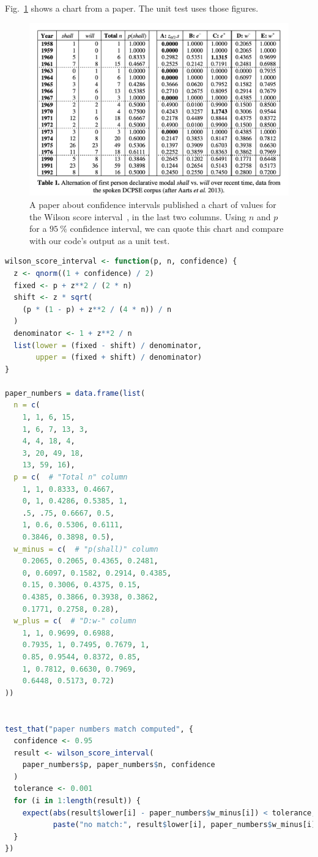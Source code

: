 \documentclass[fleqn,10pt]{olplainarticle}
\begin{document}
Fig.~\ref{fig:wilson_chart} shows a chart from a paper. The unit test
uses those figures.
\begin{figure}
    \centering
    \includegraphics[scale=0.4]{wilson_chart.pdf}
    \caption{A paper about confidence intervals published a chart of values for
    the Wilson score interval~\citep{wallis2013binomial}, in the last two columns. Using $n$ and $p$
    for a $95\:\%$ confidence interval, we can quote this chart and compare with
    our code's output as a unit test.}
    \label{fig:wilson_chart}
\end{figure}

\begin{lstlisting}[language=R]
wilson_score_interval <- function(p, n, confidence) {
  z <- qnorm((1 + confidence) / 2)
  fixed <- p + z**2 / (2 * n)
  shift <- z * sqrt(
    (p * (1 - p) + z**2 / (4 * n)) / n
  )
  denominator <- 1 + z**2 / n
  list(lower = (fixed - shift) / denominator,
       upper = (fixed + shift) / denominator)
}

paper_numbers = data.frame(list(
  n = c(
    1, 1, 6, 15,
    1, 6, 7, 13, 3,
    4, 4, 18, 4,
    3, 20, 49, 18,
    13, 59, 16),
  p = c(  # "Total n" column
    1, 1, 0.8333, 0.4667,
    0, 1, 0.4286, 0.5385, 1,
    .5, .75, 0.6667, 0.5,
    1, 0.6, 0.5306, 0.6111,
    0.3846, 0.3898, 0.5),
  w_minus = c(  # "p(shall)" column
    0.2065, 0.2065, 0.4365, 0.2481,
    0, 0.6097, 0.1582, 0.2914, 0.4385,
    0.15, 0.3006, 0.4375, 0.15,
    0.4385, 0.3866, 0.3938, 0.3862,
    0.1771, 0.2758, 0.28),
  w_plus = c(  # "D:w-" column
    1, 1, 0.9699, 0.6988,
    0.7935, 1, 0.7495, 0.7679, 1,
    0.85, 0.9544, 0.8372, 0.85,
    1, 0.7812, 0.6630, 0.7969,
    0.6448, 0.5173, 0.72)
))


test_that("paper numbers match computed", {
  confidence <- 0.95
  result <- wilson_score_interval(
    paper_numbers$p, paper_numbers$n, confidence
  )
  tolerance <- 0.001
  for (i in 1:length(result)) {
    expect(abs(result$lower[i] - paper_numbers$w_minus[i]) < tolerance,
           paste("no match:", result$lower[i], paper_numbers$w_minus[i]))
  }
})
\end{lstlisting}
\end{document}
